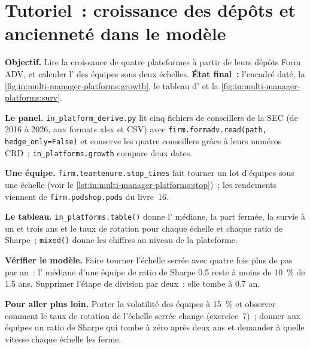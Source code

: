 \section{Tutoriel~: croissance des dépôts et ancienneté dans le modèle}\label{tut:in:multi-manager-platforms:tut}

\begin{tutorial}
\textbf{Objectif.} Lire la croissance de quatre plateformes à partir de leurs dépôts Form ADV, et calculer l' des équipes sous deux échelles.
\textbf{État final~:} l'encadré daté, la \cref{fig:in:multi-manager-platforms:growth}, le tableau d' et
la \cref{fig:in:multi-manager-platforms:surv}.
\begin{tutsteps}
\item \textbf{Le panel.} \texttt{in\_platform\_derive.py} lit cinq fichiers de conseillers de la SEC (de 2016 à 2026, aux formats xlsx et
CSV) avec \texttt{firm.formadv.read(path, hedge\_only=False)} et conserve les quatre conseillers grâce à leurs numéros CRD~;
\texttt{in\_platforms.growth} compare deux dates.
\item \textbf{Une équipe.} \texttt{firm.teamtenure.stop\_times} fait tourner un lot d'équipes sous une échelle
(voir le \cref{lst:in:multi-manager-platforms:stop})~; les rendements viennent de \texttt{firm.podshop.pods} du livre~16.
\label{lst:in:multi-manager-platforms:stop}
\item \textbf{Le tableau.} \texttt{in\_platforms.table()} donne l' médiane, la part fermée, la survie à un et
trois ans et le taux de rotation pour chaque échelle et chaque ratio de Sharpe~; \texttt{mixed()} donne les chiffres au niveau de la plateforme.
\item \textbf{Vérifier le modèle.} Faire tourner l'échelle serrée avec quatre fois plus de pas par an~: l' médiane d'une équipe
de ratio de Sharpe 0.5 reste à moins de 10~\% de 1.5 ans. Supprimer l'étape de division par deux~: elle tombe à 0.7 an.
\end{tutsteps}
\end{tutorial}

\textbf{Pour aller plus loin.} Porter la volatilité des équipes à 15~\% et observer comment le taux de rotation de l'échelle serrée change
(exercice~7)~; donner aux équipes un ratio de Sharpe qui tombe à zéro après deux ans et demander à quelle vitesse chaque échelle les ferme.

